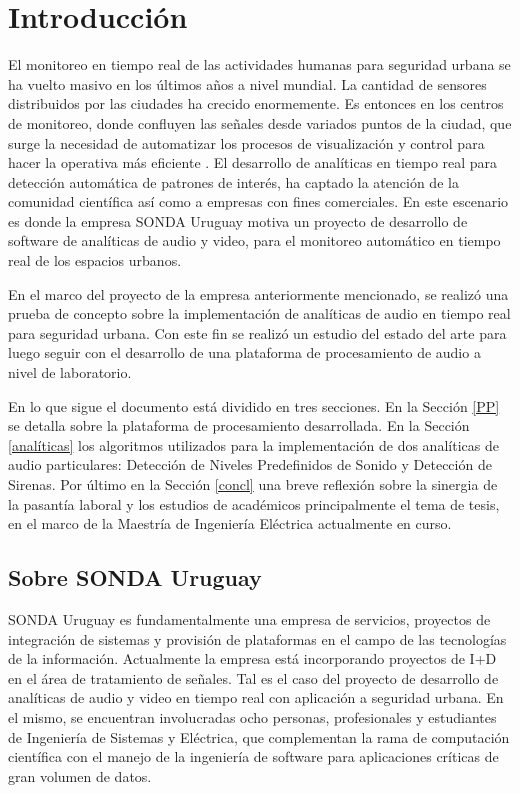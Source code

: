 \documentclass{article}
\begin{document}
\section{Introducción}
El monitoreo en tiempo real de las actividades humanas para seguridad urbana se ha vuelto masivo en los últimos años a nivel mundial. La cantidad de sensores distribuidos por las ciudades ha crecido enormemente. Es entonces en los centros de monitoreo, donde confluyen las señales desde variados puntos de la ciudad, que surge la necesidad de automatizar los procesos de visualización y control para hacer la operativa más eficiente \citep{Crocco:2016:ASS:2891449.2871183}. El desarrollo de analíticas en tiempo real para detección automática de patrones de interés, ha captado la atención de la comunidad científica así como a empresas con fines comerciales. En este escenario es donde la empresa SONDA Uruguay motiva un proyecto de desarrollo de software de analíticas de audio y video, para el monitoreo automático en tiempo real de los espacios urbanos.  

\smallskip
En el marco del proyecto de la empresa anteriormente mencionado, se realizó una prueba de concepto sobre la implementación de analíticas de audio en tiempo real para seguridad urbana. Con este fin se realizó un estudio del estado del arte para luego seguir con el desarrollo de una plataforma de procesamiento de audio a nivel de laboratorio. 

\smallskip
En lo que sigue el documento está dividido en tres secciones. En la Sección \ref{PP} se detalla sobre la plataforma de procesamiento desarrollada. En la Sección \ref{analíticas} los algoritmos utilizados para la implementación de dos analíticas de audio particulares: Detección de Niveles Predefinidos de Sonido y Detección de Sirenas. Por último en la Sección \ref{concl} una breve reflexión sobre la sinergia de la pasantía laboral y los estudios de académicos principalmente el tema de tesis, en el marco de la Maestría de Ingeniería Eléctrica actualmente en curso.  

\subsection{Sobre SONDA Uruguay}
SONDA Uruguay es fundamentalmente una empresa de servicios, proyectos de integración de sistemas y provisión de plataformas en el campo de las tecnologías de la información. Actualmente la empresa está incorporando proyectos de I+D en el área de tratamiento de señales. Tal es el caso del proyecto de desarrollo de analíticas de audio y video en tiempo real con aplicación a seguridad urbana. En el mismo, se encuentran involucradas ocho personas, profesionales y estudiantes de Ingeniería de Sistemas y Eléctrica, que complementan la rama de computación científica con el manejo de la ingeniería de software para aplicaciones críticas de gran volumen de datos.  
\end{document}
